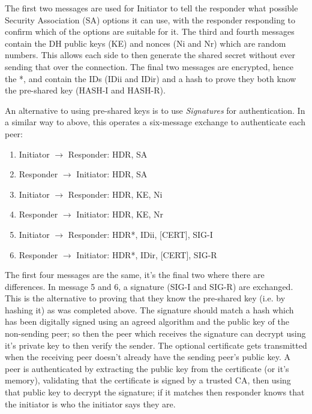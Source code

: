 The first two messages are used for Initiator to tell the responder what possible Security Association (SA) options it can use, with the responder responding to confirm which of the options are suitable for it. The third and fourth messages contain the DH public keys (KE) and nonces (Ni and Nr) which are random numbers. This allows each side to then generate the shared secret without ever sending that over the connection. The final two messages are encrypted, hence the *, and contain the IDs (IDii and IDir) and a hash to prove they both know the pre-shared key (HASH-I and HASH-R). 

An alternative to using pre-shared keys is to use \textit{Signatures} for authentication. In a similar way to above, this operates a six-message exchange to authenticate each peer:
\begin{enumerate}
    \item Initiator $\rightarrow$ Responder: HDR, SA
    \item Responder $\rightarrow$ Initiator: HDR, SA
    \item Initiator $\rightarrow$ Responder: HDR, KE, Ni
    \item Responder $\rightarrow$ Initiator: HDR, KE, Nr
    \item Initiator $\rightarrow$ Responder: HDR*, IDii, [CERT], SIG-I
    \item Responder $\rightarrow$ Initiator: HDR*, IDir, [CERT], SIG-R
\end{enumerate}

The first four messages are the same, it's the final two where there are differences. In message 5 and 6, a signature (SIG-I and SIG-R) are exchanged. This is the alternative to proving that they know the pre-shared key (i.e. by hashing it) as was completed above. The signature should match a hash which has been digitally signed using an agreed algorithm and the public key of the non-sending peer; so then the peer which receives the signature can decrypt using it's private key to then verify the sender. The optional certificate gets transmitted when the receiving peer doesn't already have the sending peer's public key. A peer is authenticated by extracting the public key from the certificate (or it's memory), validating that the certificate is signed by a trusted CA, then using that public key to decrypt the signature; if it matches then responder knows that the initiator is who the initiator says they are.

